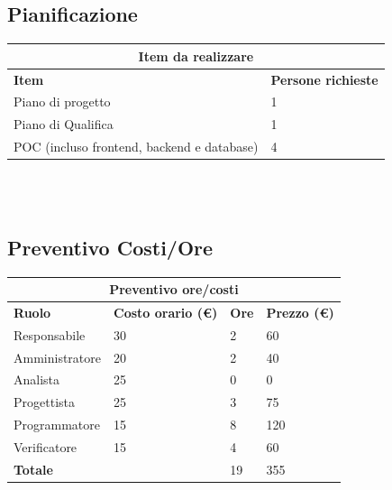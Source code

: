 \documentclass[12pt]{article}
\begin{document}
\subsection{Pianificazione}
\begin{center}
    \begin{tabularx}{\textwidth}{|X|X|}
        \hline
        \multicolumn{2}{|c|}{\textbf{Item da realizzare}}\\
        \hline
        \hline
        \textbf{Item} & \textbf{Persone richieste}\\
        \hline
        Piano di progetto & 1\\
        \hline
        Piano di Qualifica & 1 \\
        \hline
        POC (incluso frontend, backend e database) & 4 \\
        \hline
    \end{tabularx}\\[8pt]
    \mbox{}\\
\end{center}
\subsection{Preventivo Costi/Ore}
\begin{center}
    \begin{tabularx}{\textwidth}{|X|X|X|X|}
        \hline
        \multicolumn{4}{|c|}{\textbf{Preventivo ore/costi}}\\
        \hline
        \hline
        \textbf{Ruolo} & \textbf{Costo orario (\euro)} & \textbf{Ore} & \textbf{Prezzo (\euro)}\\
        \hline
        Responsabile    & 30 & 2 & 60\\   
        \hline
        Amministratore  & 20 & 2  & 40\\ 
        \hline
        Analista        & 25 & 0  & 0\\ 
        \hline
        Progettista     & 25 & 3  & 75\\
        \hline
        Programmatore   & 15 & 8  & 120\\
        \hline
        Verificatore    & 15 & 4  & 60\\
        \hline  
        \textbf{Totale} &    & 19 & 355\\
        \hline
    \end{tabularx}\\[8pt]
    \mbox{}\\
\end{center}
\end{document}
